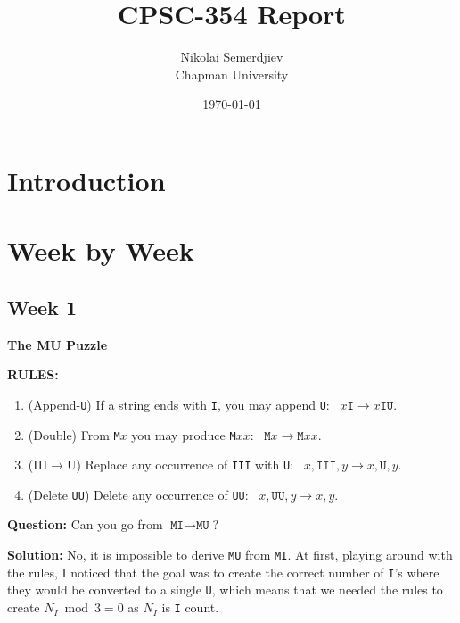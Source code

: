 \documentclass{article}
\title{CPSC-354 Report}
\author{Nikolai Semerdjiev  \\ Chapman University}
\date{\today}
\theoremstyle{theorem}
\theoremstyle{definition}
\theoremstyle{remark}
\begin{document}
\maketitle

\begin{abstract}
\end{abstract}

\setcounter{tocdepth}{3}
\tableofcontents

\section{Introduction}\label{intro}

\section{Week by Week}\label{homework}

\subsection{Week 1}

\begin{center}
    \textbf{The MU Puzzle}
\end{center}

\textbf{RULES:}

\begin{enumerate}
  \item (Append-\texttt{U}) If a string ends with \texttt{I}, you may append \texttt{U}:\
  \hspace{1em} $x\texttt{I} \to x\texttt{IU}$.
  \item (Double) From \texttt{M}$x$ you may produce \texttt{M}$xx$:\
  \hspace{1em} $\texttt{M}x \to \texttt{M}xx$.
  \item (III$\to$U) Replace any occurrence of \texttt{III} with \texttt{U}:\
  \hspace{1em} $x,\texttt{III},y \to x,\texttt{U},y$.
  \item (Delete \texttt{UU}) Delete any occurrence of \texttt{UU}:\
  \hspace{1em} $x,\texttt{UU},y \to x,y$.
\end{enumerate}

\textbf{Question:} Can you go from $\texttt{MI} \to \texttt{MU}$?

\textbf{Solution:} No, it is impossible to derive \texttt{MU} from \texttt{MI}. At first, playing around with the rules, I noticed that the goal was to create the correct number of \texttt{I}'s where they would be converted to a single \texttt{U}, which means that we needed the rules to create $N_I \bmod 3 = 0$ as $N_I$ is \texttt{I} count.
\end{document}
